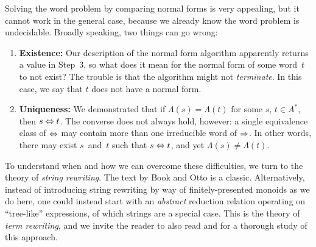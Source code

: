 \documentclass[../generics]{subfiles}
\begin{document}
\begin{center}
\end{center}

Solving the word problem by comparing normal forms is very appealing, but it cannot work in the general case, because we already know the word problem is undecidable. Broadly speaking, two things can go wrong:
\begin{enumerate}
\item \textbf{Existence:} Our description of the normal form algorithm apparently returns a value in Step~3, so what does it mean for the normal form of some word~$t$ to not exist? The trouble is that the algorithm might not \emph{terminate}. In this case, we say that $t$ does not have a normal form.
\item \textbf{Uniqueness:} We demonstrated that if $\Lambda(s)=\Lambda(t)$ for some $s$, $t\in A^*$, then $s\Leftrightarrow t$. The converse does not always hold, however: a single equivalence class of $\Leftrightarrow$ may contain more than one irreducible word of $\Rightarrow$. In other words, there may exist $s$~and~$t$ such that $s\Leftrightarrow t$, and yet $\Lambda(s) \neq \Lambda(t)$.
\end{enumerate}
To understand when and how we can overcome these difficulties, we turn to the theory of \emph{string rewriting}. The text by Book and Otto \cite{book2012string} is a classic. Alternatively, instead of introducing string rewriting by way of finitely-presented monoids as we do here, one could instead start with an \emph{abstract} reduction relation operating on ``tree-like'' expressions, of which strings are a special case. This is the theory of \emph{term rewriting}, and we invite the reader to also read \cite{andallthat} and \cite{formalmans6} for a thorough study of this approach.
\end{document}
